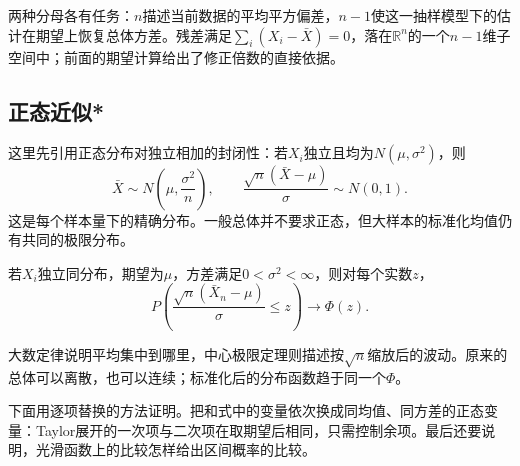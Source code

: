 两种分母各有任务：\(n\)描述当前数据的平均平方偏差，\(n-1\)使这一抽样模型下的估计在期望上恢复总体方差。残差满足\(\sum_i(X_i-\bar X)=0\)，落在\(\mathbb R^n\)的一个\(n-1\)维子空间中；前面的期望计算给出了修正倍数的直接依据。

\subsection{正态近似*}

这里先引用正态分布对独立相加的封闭性：若\(X_i\)独立且均为\(N(\mu,\sigma^2)\)，则
\[
 \bar X\sim N\left(\mu,\frac{\sigma^2}n\right),\qquad
 \frac{\sqrt n(\bar X-\mu)}\sigma\sim N(0,1).
\]
这是每个样本量下的精确分布。一般总体并不要求正态，但大样本的标准化均值仍有共同的极限分布。

\begin{theorem}[中心极限定理]
若\(X_i\)独立同分布，期望为\(\mu\)，方差满足\(0<\sigma^2<\infty\)，则对每个实数\(z\)，
\begin{equation}\label{eq:prob-clt}
 P\left(\frac{\sqrt n(\bar X_n-\mu)}\sigma\le z\right)
 \longrightarrow\Phi(z).
\end{equation}
\end{theorem}

大数定律说明平均集中到哪里，中心极限定理则描述按\(\sqrt n\)缩放后的波动。原来的总体可以离散，也可以连续；标准化后的分布函数趋于同一个\(\Phi\)。

下面用逐项替换的方法证明。把和式中的变量依次换成同均值、同方差的正态变量：Taylor展开的一次项与二次项在取期望后相同，只需控制余项。最后还要说明，光滑函数上的比较怎样给出区间概率的比较。

